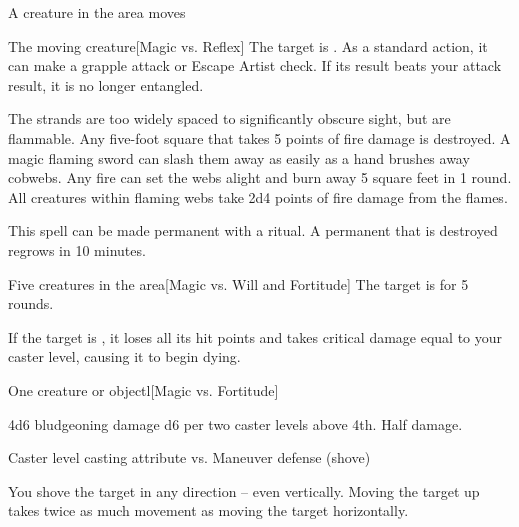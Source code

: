 \spelldur{\durshort \dismissable}
\begin{spelltrigger}{A creature in the area moves}
    \begin{spelltarget}{The moving creature}[Magic vs. Reflex]
        \spellsuccess The target is \entangled. As a standard action, it can make a grapple attack or Escape Artist check. If its result beats your attack result, it is no longer entangled.
    \end{spelltarget}
\end{spelltrigger}
\spellnotes The strands are too widely spaced to significantly obscure sight, but are flammable. Any five-foot square that takes 5 points of fire damage is destroyed. A magic flaming sword can slash them away as easily as a hand brushes away cobwebs. Any fire can set the webs alight and burn away 5 square feet in 1 round. All creatures within flaming webs take 2d4 points of fire damage from the flames.

This spell can be made permanent with a  ritual. A permanent  that is destroyed regrows in 10 minutes.

\begin{spelltarget}{Five creatures in the area}[Magic vs. Will and Fortitude]
    \spellsuccess[Will] The target is \shaken for 5 rounds.

     If the target is \bloodied, it loses all its hit points and takes critical damage equal to your caster level, causing it to begin dying.
\end{spelltarget}

\spellrng{\rngmed}
\begin{spelltarget}{One creature or object}l[Magic vs. Fortitude]
    \begin{spellmargin}
        \spellsuccess 4d6 bludgeoning damage \add d6 per two caster levels above 4th.
        \spellfailure Half damage.
    \end{spellmargin}
    \spellattack Caster level \add casting attribute vs. Maneuver defense (shove)
    \begin{spellmargin}
        \spellsuccess You shove the target in any direction -- even vertically. Moving the target up takes twice as much movement as moving the target horizontally.
    \end{spellmargin}
\end{spelltarget}

